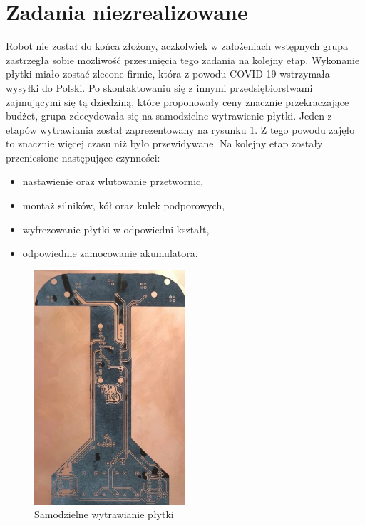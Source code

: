 \documentclass[10pt, a4paper]{article}
\begin{document}
\section{Zadania niezrealizowane}

Robot nie został do końca złożony, aczkolwiek w założeniach wstępnych grupa zastrzegła sobie możliwość przesunięcia tego zadania na kolejny etap. Wykonanie płytki miało zostać zlecone firmie, która z powodu COVID-19 wstrzymała wysyłki do Polski. Po skontaktowaniu się z innymi przedsiębiorstwami zajmującymi się tą dziedziną, które proponowały ceny znacznie przekraczające budżet, grupa zdecydowała się na samodzielne wytrawienie płytki. Jeden z etapów wytrawiania został zaprezentowany na rysunku \ref{fig:wytrawianie}. Z tego powodu zajęło to znacznie więcej czasu niż było przewidywane. Na kolejny etap zostały przeniesione następujące czynności:
\begin{itemize}
    \item nastawienie oraz wlutowanie przetwornic,
    \item montaż silników, kół oraz kulek podporowych,
    \item wyfrezowanie płytki w odpowiedni kształt,
    \item odpowiednie zamocowanie akumulatora.
    
\end{itemize}

\begin{figure}[H]
    \centering
    \includegraphics[width = 0.5\textwidth]{wytrawianie.jpg}
    \caption{Samodzielne wytrawianie płytki}
    \label{fig:wytrawianie}
\end{figure}




{}

\nocite{ksiazka1}
\nocite{ksiazka2}
\nocite{gazetka}

\nocite{dok1}
\nocite{dok2}
\nocite{dok3}
\nocite{dok4}
\nocite{dok5}
\nocite{dok6}
\end{document}
